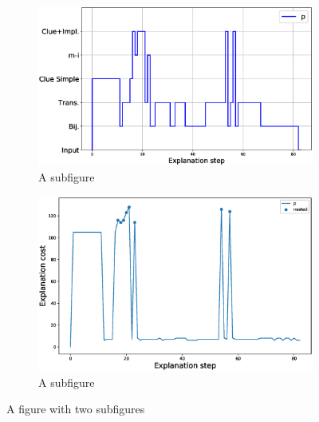 \begin{figure}
\centering
\begin{subfigure}{.5\textwidth}
	\centering
	\includegraphics[width=0.98\linewidth]{figures/plot_cost_steps_p.eps}
	\caption{A subfigure}
	\label{fig:sub1}
\end{subfigure}%
\begin{subfigure}{.5\textwidth}
	\centering
	\includegraphics[width=0.9\linewidth]{figures/P.eps}
	\caption{A subfigure}
	\label{fig:sub2}
\end{subfigure}
\caption{A figure with two subfigures}
\label{fig:test}
\end{figure}

